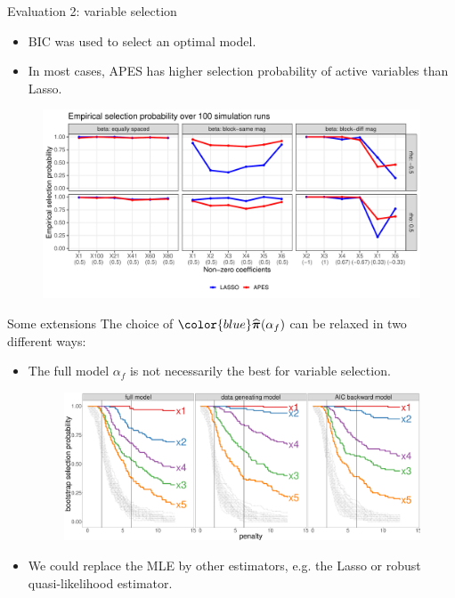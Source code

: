 \documentclass[12pt,aspectratio=169]{beamer}
\newcommand{\bPiHat}{\widehat{\boldsymbol{\pi}}}
\newcommand{\alphaFull}{\alpha_{f}}
\begin{document}
\begin{frame}{Evaluation 2: variable selection}

\begin{itemize}
	\item BIC was used to select an optimal model. 
	\item In most cases, APES has higher selection probability of active variables than Lasso. 
\end{itemize}

\begin{figure}
	\centering
	\includegraphics[width=0.8\linewidth]{ecostaSelectedModelBetaPlot_2018_May_11}
\end{figure}
\end{frame}



\begin{frame}{Some extensions}
The choice of $ {\color{blue}\bPiHat(\alphaFull)} $ can be relaxed in two different ways: 
\begin{itemize}
	\item The full model $ \alphaFull $ is not necessarily the best for variable selection. 
\begin{figure}
	\centering
	\includegraphics[width=0.8\linewidth]{varSelectionPlot_2018_Sep_11}
\end{figure}
	\item We could replace the MLE by other estimators, e.g. the Lasso or robust quasi-likelihood estimator.
\end{itemize}
\end{frame}
\end{document}
